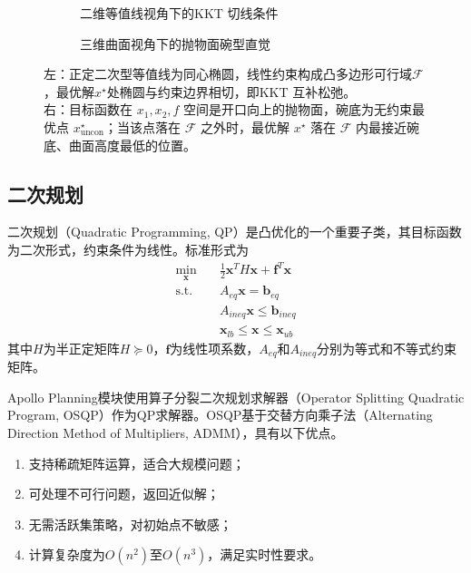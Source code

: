 \begin{figure}[htbp]
\centering
\begin{subfigure}[b]{0.48\textwidth}
  \centering
  \caption{二维等值线视角下的KKT 切线条件}
  \label{fig:qp_geometry:2d}
\end{subfigure}\hfill
\begin{subfigure}[b]{0.48\textwidth}
  \centering
  \caption{三维曲面视角下的抛物面碗型直觉}
  \label{fig:qp_geometry:3d}
\end{subfigure}
\caption{凸二次规划的几何解释}
\caption*{\scriptsize 左：正定二次型等值线为同心椭圆，线性约束构成凸多边形可行域$\mathcal{F}$，最优解$x^\star$处椭圆与约束边界相切，即KKT 互补松弛。\\右：目标函数在 $x_1,x_2,f$ 空间是开口向上的抛物面，碗底为无约束最优点 $x^\star_{\text{uncon}}$；当该点落在 $\mathcal{F}$ 之外时，最优解 $x^\star$ 落在 $\mathcal{F}$ 内最接近碗底、曲面高度最低的位置。}
\label{fig:qp_geometry}
\end{figure}

\subsection{二次规划}

二次规划（Quadratic Programming, QP）是凸优化的一个重要子类，其目标函数为二次形式，约束条件为线性。标准形式为
\begin{equation}
\begin{aligned}
\min_{\mathbf{x}} \quad & \frac{1}{2}\mathbf{x}^T H \mathbf{x} + \mathbf{f}^T \mathbf{x} \\
\text{s.t.} \quad & A_{eq}\mathbf{x} = \mathbf{b}_{eq} \\
& A_{ineq}\mathbf{x} \leq \mathbf{b}_{ineq} \\
& \mathbf{x}_{lb} \leq \mathbf{x} \leq \mathbf{x}_{ub}
\end{aligned}
\label{eq:qp_standard}
\end{equation}
其中$H$为半正定矩阵$H \succeq 0$，$\mathbf{f}$为线性项系数，$A_{eq}$和$A_{ineq}$分别为等式和不等式约束矩阵。

Apollo Planning模块使用算子分裂二次规划求解器（Operator Splitting Quadratic Program, OSQP）\cite{stellato2020osqp}作为QP求解器。OSQP基于交替方向乘子法（Alternating Direction Method of Multipliers, ADMM），具有以下优点。
\begin{enumerate}
\item 支持稀疏矩阵运算，适合大规模问题；
\item 可处理不可行问题，返回近似解；
\item 无需活跃集策略，对初始点不敏感；
\item 计算复杂度为$O(n^2)$至$O(n^3)$，满足实时性要求。
\end{enumerate}

